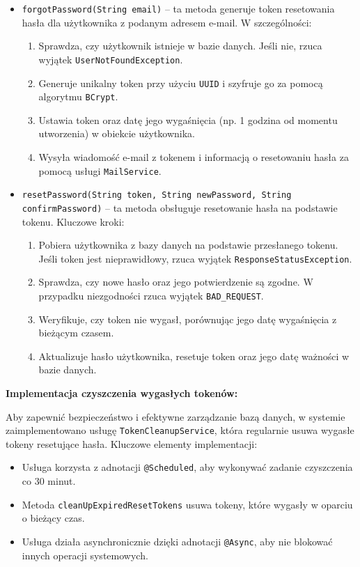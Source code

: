 \begin{itemize}
    \item \texttt{forgotPassword(String email)} -- ta metoda generuje token resetowania hasła dla użytkownika z podanym adresem e-mail. W szczególności:
    \begin{enumerate}
        \item Sprawdza, czy użytkownik istnieje w bazie danych. Jeśli nie, rzuca wyjątek \texttt{UserNotFoundException}.
        \item Generuje unikalny token przy użyciu \texttt{UUID} i szyfruje go za pomocą algorytmu \texttt{BCrypt}.
        \item Ustawia token oraz datę jego wygaśnięcia (np. 1 godzina od momentu utworzenia) w obiekcie użytkownika.
        \item Wysyła wiadomość e-mail z tokenem i informacją o resetowaniu hasła za pomocą usługi \texttt{MailService}.
    \end{enumerate}

    \item \texttt{resetPassword(String token, String newPassword, String confirmPassword)} -- ta metoda obsługuje resetowanie hasła na podstawie tokenu. Kluczowe kroki:
    \begin{enumerate}
        \item Pobiera użytkownika z bazy danych na podstawie przesłanego tokenu. Jeśli token jest nieprawidłowy, rzuca wyjątek \texttt{ResponseStatusException}.
        \item Sprawdza, czy nowe hasło oraz jego potwierdzenie są zgodne. W przypadku niezgodności rzuca wyjątek \texttt{BAD\_REQUEST}.
        \item Weryfikuje, czy token nie wygasł, porównując jego datę wygaśnięcia z bieżącym czasem.
        \item Aktualizuje hasło użytkownika, resetuje token oraz jego datę ważności w bazie danych.
    \end{enumerate}
\end{itemize}


\textbf{Implementacja czyszczenia wygasłych tokenów:}

Aby zapewnić bezpieczeństwo i efektywne zarządzanie bazą danych, w systemie zaimplementowano usługę \texttt{TokenCleanupService}, która regularnie usuwa wygasłe tokeny resetujące hasła. Kluczowe elementy implementacji:
\begin{itemize}
    \item Usługa korzysta z adnotacji \texttt{@Scheduled}, aby wykonywać zadanie czyszczenia co 30 minut.
    \item Metoda \texttt{cleanUpExpiredResetTokens} usuwa tokeny, które wygasły w oparciu o bieżący czas.
    \item Usługa działa asynchronicznie dzięki adnotacji \texttt{@Async}, aby nie blokować innych operacji systemowych.
\end{itemize}

